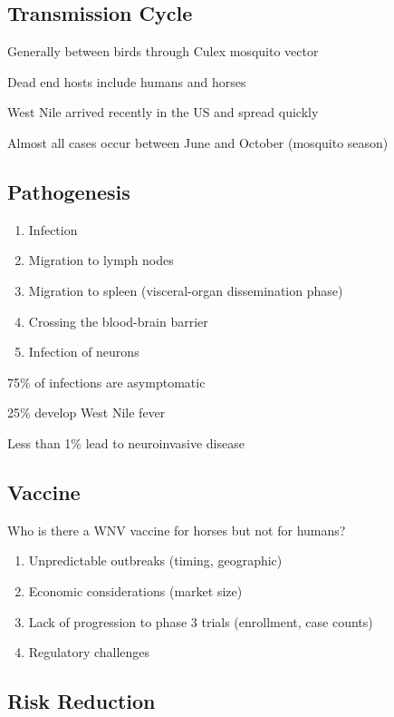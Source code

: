 \documentclass{notes}
\begin{document}
\subsection{Transmission Cycle}

Generally between birds through Culex mosquito vector

\tab Dead end hosts include humans and horses

West Nile arrived recently in the US and spread quickly


Almost all cases occur between June and October (mosquito season)

\subsection{Pathogenesis}

\begin{enumerate}
    \item Infection
    \item Migration to lymph nodes
    \item Migration to spleen (visceral-organ dissemination phase)
    \item Crossing the blood-brain barrier
    \item Infection of neurons
\end{enumerate}

75\% of infections are asymptomatic

25\% develop West Nile fever

Less than 1\% lead to neuroinvasive disease

\subsection{Vaccine}

Who is there a WNV vaccine for horses but not for humans?

\begin{enumerate}
    \item Unpredictable outbreaks (timing, geographic)
    \item Economic considerations (market size)
    \item Lack of progression to phase 3 trials (enrollment, case counts)
    \item Regulatory challenges
\end{enumerate}

\subsection{Risk Reduction}
\end{document}
